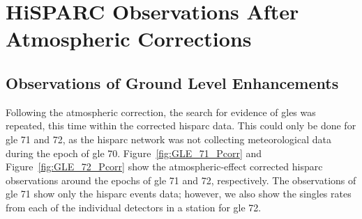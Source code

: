  

\section{HiSPARC Observations After Atmospheric Corrections}\label{sec:HS_obs_Pcorr}


\subsection{Observations of Ground Level Enhancements}

Following the atmospheric correction, the search for evidence of \glspl{gle} was repeated, this time within the corrected \gls{hisparc} data. This could only be done for \gls{gle} 71 and 72, as the \gls{hisparc} network was not collecting meteorological data during the epoch of \gls{gle} 70. Figure~\ref{fig:GLE_71_Pcorr} and Figure~\ref{fig:GLE_72_Pcorr} show the atmospheric-effect corrected \gls{hisparc} observations around the epochs of \gls{gle} 71 and 72, respectively. The observations of \gls{gle} 71 show only the \gls{hisparc} events data; however, we also show the singles rates from each of the individual detectors in a station for \gls{gle} 72.

